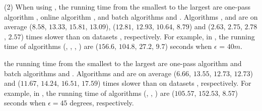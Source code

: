 \sstab (2) When using \sed, the running time from the smallest to the largest are one-pass algorithm \cised, online algorithm \squishe, and batch algorithms \tpa and \dpa.
Algorithms \tpa, \dpa and \squishe are on average
($8.58$, $13.33$, $15.81$, $13.09$), ($12.81$, $12.93$, $10.64$, $8.79$) and
($2.63$, $2.75$, $2.78$, $2.57$) times slower than \cised on datasets \dSets, respectively.
%
For example, in \mopsi, the running time of algorithms
(\tpa, \dpa, \squishe, \cised) are  ($156.6$, $104.8$, $27.2$, $9.7$) seconds when $\epsilon$ = $40m$.

 the running time from the smallest to the
largest are one-pass algorithm \interval and batch algorithms \tpa and \dpa.
%
Algorithms \tpa and \dpa are on average
($6.66$, $13.55$, $12.73$, $12.73$) and ($11.67$, $14.24$, $16.51$, $17.59$)
times slower than \interval on datasets \dSets, respectively.
%
For example, in \mopsi, the running time of algorithms
(\tpa, \dpa, \interval) are ($105.57$, $152.53$, $8.57$) seconds when
$\epsilon=45$ degrees, respectively.









